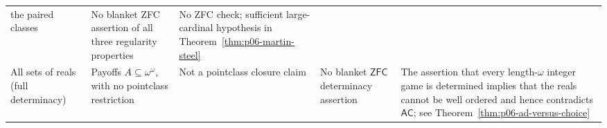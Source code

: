 \begin{landscape}
\begin{longtable}{@{}p{.13\linewidth}p{.20\linewidth}p{.20\linewidth}
  p{.24\linewidth}p{.17\linewidth}@{}}
the paired classes &
No blanket ZFC assertion of all three regularity properties &
No ZFC check; sufficient large-cardinal hypothesis in
Theorem~\ref{thm:p06-martin-steel} \\
All sets of reals (full determinacy) &
Payoffs \(A\subseteq\omega^\omega\), with no pointclass restriction &
Not a pointclass closure claim &
No blanket \(\mathsf{ZFC}\) determinacy assertion &
The assertion that every length-\(\omega\) integer game is determined implies
that the reals cannot be well ordered and hence contradicts
\(\mathsf{AC}\); see Theorem~\ref{thm:p06-ad-versus-choice} \\
\bottomrule
\end{longtable}
\endgroup
\end{landscape}
\thispagestyle{empty}%
